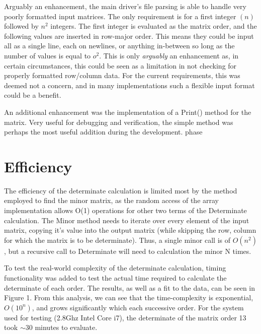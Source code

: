 \documentclass[a4paper,12pt]{article}
\begin{document}
Arguably an enhancement, the main driver's file parsing is able to handle very poorly formatted input matrices.  The only requirement 
is for a first integer $(n)$ followed by $n^2$ integers.  The first integer is evaluated as the matrix order, and the following values are 
inserted in row-major order.  This means they could be input all as a single line, each on newlines, or anything in-between so long as
the number of values is equal to $o^2$.  This is only {\it arguably} an enhancement as, in certain circumstances, this could be seen as
a limitation in not checking for properly formatted row/column data.  For the current requirements, this was deemed not a concern, and in
many implementations such a flexible input format could be a benefit.

An additional enhancement was the implementation of a Print() method for the matrix.  Very useful for debugging and 
verification, the simple method was perhaps the most useful addition during the development. phase



\section{Efficiency}
The efficiency of the determinate calculation is limited most by the method employed to find the minor matrix, as the 
random access of the array implementation allows O(1) operations for other two terms of the Determinate calculation.
The Minor method needs to iterate over every element of the input matrix, copying it's value into the output matrix (while 
skipping the row, column for which the matrix is to be determinate).  Thus, a single minor call is of $O(n^2)$, but a 
recursive call to Determinate will need to calculation the minor N times. 

To test the real-world complexity of the determinate calculation, timing functionality was added to test the actual time required
to calculate the determinate of each order. The results, as well as a fit to the data, can be seen in Figure 1.  From this analysis, we
can see that the time-complexity is exponential, $O(10^n)$, and grows significantly which each successive order. 
 For the system used for testing (2.8Ghz Intel Core i7), the determinate of the matrix order 13 took $\sim$30 minutes to evaluate.
\end{document}
